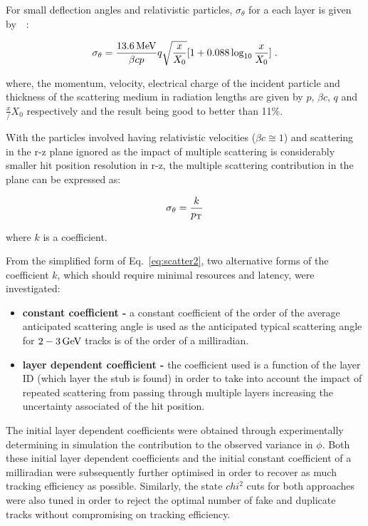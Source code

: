 {For small deflection angles and relativistic particles, $\sigma_{\theta}$ for a each layer is given by~\cite{Lynch:1990sq}~:

\begin{equation}
\sigma_{\theta} = \frac{13.6\,\text{Me\hspace{-.08em}V}}{\beta c p} q \sqrt{\frac{x}{X_{0}}} [1 + 0.088 \log_{10}{\frac{x}{X_{0}}}]  \;.
\label{eq:scatter1}
\end{equation}

where, the momentum, velocity, electrical charge of the incident particle and thickness of the scattering medium in radiation lengths are given by $p$, $\beta c$, $q$ and $\frac{x}/{X_{0}}$ respectively and the result being good to better than 11\%.

With the particles involved having relativistic velocities (\ie $\beta c \cong 1$) and scattering in the r-z plane ignored as the impact of multiple scattering is considerably smaller hit position resolution in r-z, the multiple scattering contribution in the \rphi plane can be expressed as:

\begin{equation}
\sigma_{\theta} = \frac{k}{p_{\mathrm{T}}}
\label{eq:scatter2}
\end{equation}

where $k$ is a coefficient.

From the simplified form of Eq.~\ref{eq:scatter2}, two alternative forms of the coefficient $k$, which should require minimal resources and latency, were investigated:

\begin{itemize}
\item \textbf{constant coefficient - } a constant coefficient of the order of the average anticipated scattering angle is used as the anticipated typical scattering angle for $2-3\,\text{Ge\hspace{-.08em}V}$ tracks is of the order of a milliradian.
\item \textbf{layer dependent coefficient -} the coefficient used is a function of the layer ID (\ie which layer the stub is found) in order to take into account the impact of repeated scattering from passing through multiple layers increasing the uncertainty associated of the hit position.
\end{itemize}

The initial layer dependent coefficients were obtained through experimentally determining in simulation the \MS contribution to the observed variance in $\phi$.
Both these initial layer dependent coefficients and the initial constant coefficient of a milliradian were subsequently further optimised in order to recover as much tracking efficiency as  possible.
Similarly, the \KF state $chi^{2}$ cuts for both approaches were also tuned in order to reject the optimal number of fake and duplicate tracks without compromising on tracking efficiency.

}
